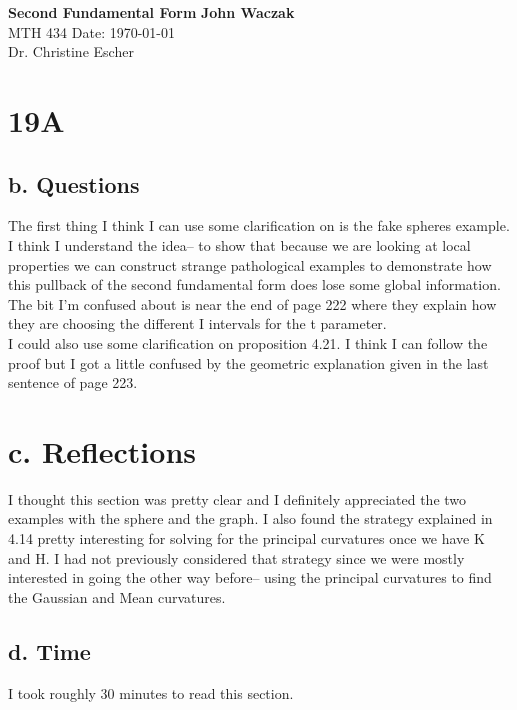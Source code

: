 \documentclass[a4paper, 11pt]{article}
\begin{document}
\noindent
\large\textbf{Second Fundamental Form} \hfill \textbf{John Waczak} \\
\normalsize MTH 434 \hfill  Date: \today \\
Dr. Christine Escher \\

\section*{19A}
	\subsection*{b. Questions}
	 The first thing I think I can use some clarification on is the fake spheres example. I think I understand the idea-- to show that because we are looking at local properties we can construct strange pathological examples to demonstrate how this pullback of the second fundamental form does lose some global information. The bit I'm confused about is near the end of page 222 where they explain how they are choosing the different I intervals for the t parameter. \\ 
	 
	 I could also use some clarification on proposition 4.21. I think I can follow the proof but I got a little confused by the geometric explanation given in the last sentence of page 223. 
	
	\section*{c. Reflections}
	I thought this section was pretty clear and I definitely appreciated the two examples with the sphere and the graph. I also found the strategy explained in 4.14 pretty interesting for solving for the principal curvatures once we have K and H. I had not previously considered that strategy since we were mostly interested in going the other way before-- using the principal curvatures to find the Gaussian and Mean curvatures. 
	
	
	\subsection*{d. Time}
	I took roughly 30 minutes to read this section. 
\end{document}
